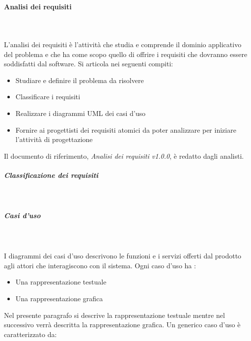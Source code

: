 \documentclass[../norme-di-progetto.tex]{subfiles}
\begin{document}
\paragraph{Analisi dei requisiti}\mbox{}\\
\label{par:analisi dei requisiti}
\\L'analisi dei requisiti è l'attività che studia e comprende il dominio applicativo del problema e che ha come scopo quello di offrire i requisiti che dovranno essere soddisfatti dal software. Si articola nei seguenti compiti:
\begin{itemize}
	\item Studiare e definire il problema da risolvere
	\item Classificare i requisiti
	\item Realizzare i diagrammi UML dei casi d'uso
	\item Fornire ai progettisti dei requisiti atomici da poter analizzare per iniziare l'attività di progettazione
\end{itemize} 
Il documento di riferimento, \textit{Analisi dei requisiti v1.0.0}, è redatto dagli analisti.
\subparagraph{Classificazione dei requisiti}\mbox{}\\
\label{subp:classificazione dei requisiti}
\subparagraph{Casi d'uso}\mbox{}\\
\label{subp:casi d'uso}
\\ I diagrammi dei casi d'uso descrivono le funzioni e i servizi offerti dal prodotto agli attori che interagiscono con il sistema. Ogni caso d'uso ha :
\begin{itemize}
	\item Una rappresentazione testuale
	\item Una rappresentazione grafica
\end{itemize}
Nel presente paragrafo si descrive la rappresentazione testuale mentre nel successivo verrà descritta la rappresentazione grafica. Un generico caso d'uso è caratterizzato da:
\end{document}

